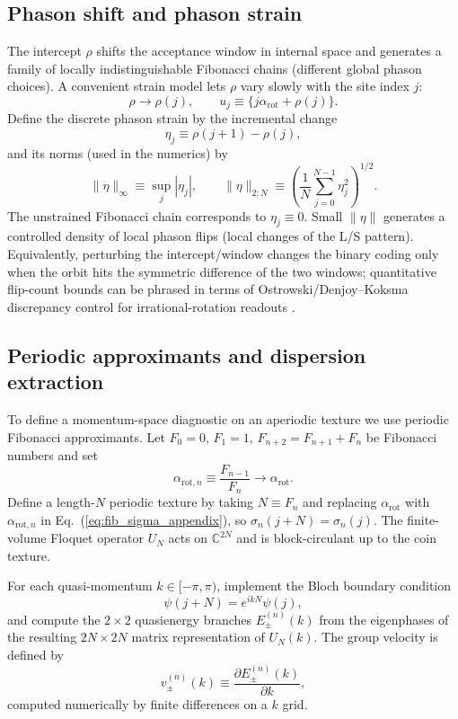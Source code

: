 \subsection{Phason shift and phason strain}
The intercept $\rho$ shifts the acceptance window in internal space and generates a family of locally indistinguishable Fibonacci chains (different global phason choices). A convenient strain model lets $\rho$ vary slowly with the site index $j$:
\begin{equation}
    \rho\to \rho(j),\qquad u_j\equiv \{j\alpha_{\mathrm{rot}}+\rho(j)\}.
\end{equation}
Define the discrete phason strain by the incremental change
\begin{equation}
    \eta_j \equiv \rho(j+1)-\rho(j),
\end{equation}
and its norms (used in the numerics) by
\begin{equation}
    \|\eta\|_{\infty}\equiv \sup_j |\eta_j|,\qquad
    \|\eta\|_{2;N}\equiv \left(\frac{1}{N}\sum_{j=0}^{N-1}\eta_j^2\right)^{1/2}.
\end{equation}
The unstrained Fibonacci chain corresponds to $\eta_j\equiv 0$. Small $\|\eta\|$ generates a controlled density of local phason flips (local changes of the L/S pattern).
Equivalently, perturbing the intercept/window changes the binary coding only when the orbit hits the symmetric difference of the two windows; quantitative flip-count bounds can be phrased in terms of Ostrowski/Denjoy--Koksma discrepancy control for irrational-rotation readouts \cite{Ma2025HPA}.

\subsection{Periodic approximants and dispersion extraction}
To define a momentum-space diagnostic on an aperiodic texture we use periodic Fibonacci approximants. Let $F_0=0$, $F_1=1$, $F_{n+2}=F_{n+1}+F_n$ be Fibonacci numbers and set
\begin{equation}
    \alpha_{\mathrm{rot},n} \equiv \frac{F_{n-1}}{F_n}\to \alpha_{\mathrm{rot}}.
\end{equation}
Define a length-$N$ periodic texture by taking $N\equiv F_n$ and replacing $\alpha_{\mathrm{rot}}$ with $\alpha_{\mathrm{rot},n}$ in Eq.~(\ref{eq:fib_sigma_appendix}), so $\sigma_n(j+N)=\sigma_n(j)$. The finite-volume Floquet operator $U_N$ acts on $\mathbb{C}^{2N}$ and is block-circulant up to the coin texture.\par
For each quasi-momentum $k\in[-\pi,\pi)$, implement the Bloch boundary condition
\begin{equation}
    \psi(j+N)=e^{ikN}\psi(j),
\end{equation}
and compute the $2\times 2$ quasienergy branches $E^{(n)}_{\pm}(k)$ from the eigenphases of the resulting $2N\times 2N$ matrix representation of $U_N(k)$. The group velocity is defined by
\begin{equation}
    v^{(n)}_{\pm}(k)\equiv \frac{\partial E^{(n)}_{\pm}(k)}{\partial k},
\end{equation}
computed numerically by finite differences on a $k$ grid.

